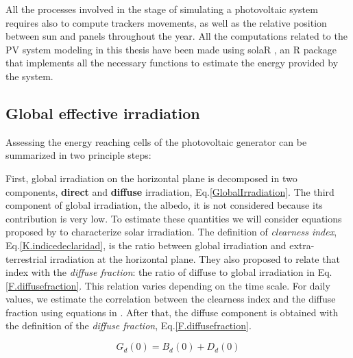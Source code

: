 All the processes involved in the stage of simulating a photovoltaic system requires also to compute trackers movements, as well as the relative position between sun and panels throughout the year. All the computations related to the PV system modeling in this thesis have been made using solaR \cite*{Perpinan2012}, an R package that implements all the necessary functions to estimate the energy provided by the system.

\subsection{Global effective irradiation}

Assessing the energy reaching cells of the photovoltaic generator can be summarized in two principle steps:

First, global irradiation on the horizontal plane is decomposed in two components, \textbf{direct} and \textbf{diffuse} irradiation, Eq.\ref{GlobalIrradiation}. The third component of global irradiation, the albedo, it is not considered because its contribution is very low. To estimate these quantities we will consider equations proposed by \cite{Liu1960} to characterize solar irradiation. The definition of \textit{clearness index}, Eq.\ref{K.indicedeclaridad}, is the ratio between global irradiation and extra-terrestrial irradiation at the horizontal plane. They also proposed to relate that index with the \textit{diffuse fraction}: the ratio of diffuse to global irradiation in Eq.\ref{F.diffusefraction}. This relation varies depending on the time scale. For daily values, we estimate the correlation between the clearness index and the diffuse fraction using equations in \cite{Aguiar1992}. After that, the diffuse component is obtained with the definition of the \textit{diffuse fraction}, Eq.\ref{F.diffusefraction}.

\begin{equation}\label{GlobalIrradiation}
G_{d}(0) = B_{d}(0) + D_{d}(0)
\end{equation}



